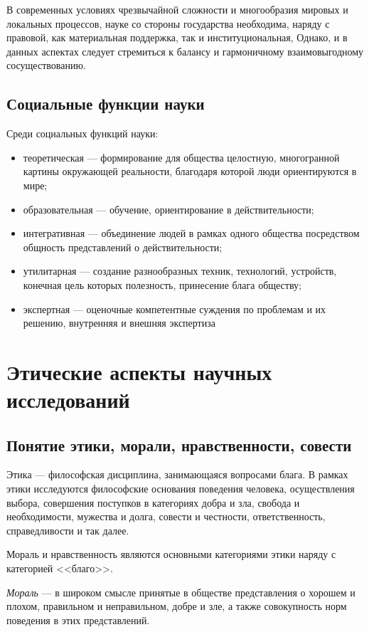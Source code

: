 В современных условиях чрезвычайной сложности и
многообразия мировых и локальных процессов, науке со стороны государства
необходима, наряду с правовой, как материальная поддержка, так и
институциональная, Однако, и в данных аспектах следует стремиться к балансу и гармоничному
взаимовыгодному сосуществованию.

\subsection{Социальные функции науки}

Среди социальных функций науки:
\begin{itemize}
    \item теоретическая --- формирование для общества целостную, многогранной картины
    окружающей реальности, благодаря которой люди ориентируются в мире;
    \item образовательная --- обучение, ориентирование в действительности;
    \item интегративная --- объединение людей в рамках одного общества посредством общность
    представлений о действительности;
    \item утилитарная --- создание разнообразных техник, технологий, устройств, конечная цель которых полезность, принесение блага обществу;
    \item экспертная --- оценочные компетентные суждения по проблемам и их решению,  внутренняя и внешняя экспертиза
\end{itemize}

\section{Этические аспекты научных исследований}

\subsection{Понятие этики, морали, нравственности, совести} 

Этика --- философская дисциплина, занимающаяся вопросами блага. В рамках этики
исследуются философские основания поведения человека, осуществления выбора,
совершения поступков в категориях добра и зла, свобода и необходимости, мужества
и долга, совести и честности, ответственность, справедливости и так далее. 

Мораль и нравственность являются основными категориями этики наряду с категорией <<благо>>.

\textit{Мораль} --- в широком смысле принятые в обществе представления о хорошем и
плохом, правильном и неправильном, добре и зле, а также совокупность норм
поведения в этих представлений. 


